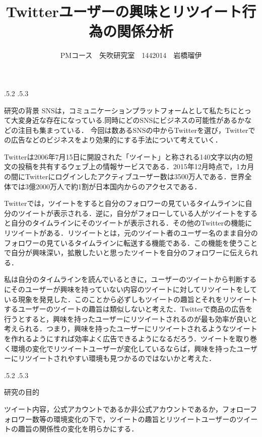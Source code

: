 \documentclass[uplatex]{jsarticle}
\title{\vspace{-14mm}Twitterユーザーの興味とリツイート行為の関係分析}
\author{PMコース　矢吹研究室　1442014　岩橋瑠伊}
\date{}%
\makeatletter
\renewcommand{\section}{%
    \if@slide\clearpage\fi
    \@startsection{section}{1}{\z@}%
    {\Cvs \@plus.5\Cdp \@minus.2\Cdp}%
    {.5\Cvs \@plus.3\Cdp}%
    {\normalfont\raggedright}}
\makeatother
\begin{document}
\maketitle





\section{研究の背景}
SNSは，コミュニケーションプラットフォームとして私たちにとって大変身近な存在になっている.同時にどのSNSにビジネスの可能性があるかなどの注目も集まっている．
今回は数あるSNSの中からTwitterを選び，Twitterでの広告などのビジネスをより効果的にする手法について考えていく\cite{sns}．

Twitterは2006年7月15日に開設された「ツイート」と称される140文字以内の短文の投稿を共有するウェブ上の情報サービスである．2015年12月時点で，1カ月の間にTwitterにログインしたアクティブユーザー数は3500万人である．世界全体では3億2000万人で約1割が日本国内からのアクセスである\cite{twitter}．

Twitterでは，ツイートをすると自分のフォロワーの見ているタイムラインに自分のツイートが表示される．逆に，自分がフォローしている人がツイートをすると自分のタイムラインにそのツイートが表示される．その他のTwitterの機能にリツイートがある．リツイートとは，元のツイート者のユーザー名のまま自分のフォロワーの見ているタイムラインに転送する機能である．この機能を使うことで自分が興味深い，拡散したいと思ったツイートを自分のフォロワーに伝えられる．

私は自分のタイムラインを読んでいるときに，ユーザーのツイートから判断するにそのユーザーが興味を持っていない内容のツイートに対してリツイートをしている現象を発見した．このことから必ずしもツイートの趣旨とそれをリツイートするユーザーのツイートの趣旨は類似しないと考えた．Twitterで商品の広告を行うとすると，興味を持ったユーザーにリツイートされるのが最も効率が良いと考えられる．つまり，興味を持ったユーザーにリツイートされるようなツイートを作れるようにすれば効率よく広告できるようになるだろう．ツイートを取り巻く環境の変化でリツイートユーザーが変化しているならば，興味を持ったユーザーにリツイートされやすい環境も見つかるのではないかと考えた．

\section{研究の目的}

ツイート内容，公式アカウントであるか非公式アカウントであるか，フォローフォロワー数等の環境変化の下で，ツイートの趣旨とリツイートユーザーのツイートの趣旨の関係性の変化を明らかにする．
\end{document}
